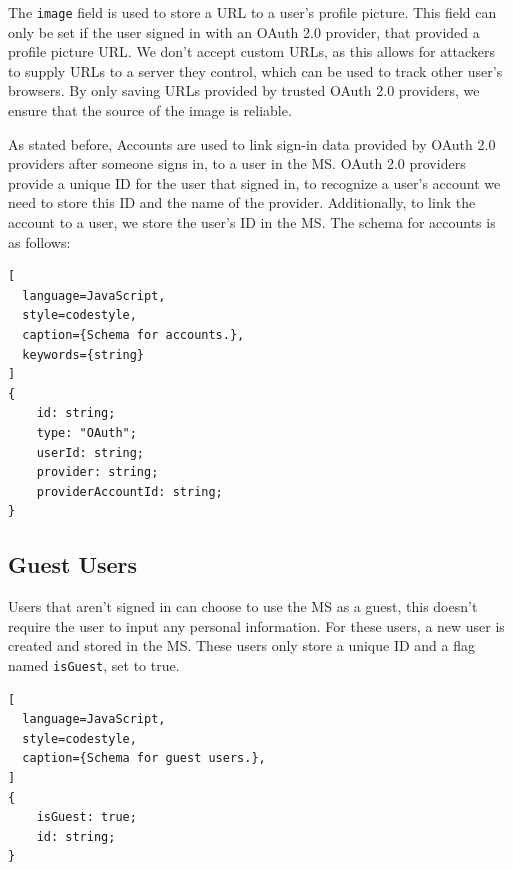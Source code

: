 The \lstinline{image} field is used to store a URL to a user's profile picture. 
This field can only be set if the user signed in with an OAuth 2.0 provider,
that provided a profile picture URL.
We don't accept custom URLs,
as this allows for attackers to supply URLs to a server they control,
which can be used to track other user's browsers.
By only saving URLs provided by trusted OAuth 2.0 providers, we ensure that the
source of the image is reliable.

As stated before, Accounts are used to link sign-in data provided by OAuth 2.0 providers
after someone signs in, to a user in the MS.
OAuth 2.0 providers provide a unique ID for the user that signed in,
to recognize a user's account we need to store this ID and
the name of the provider.
Additionally, to link the account to a user, we store the user's ID in the MS.
The schema for accounts is as follows:

\begin{lstlisting}[
  language=JavaScript,
  style=codestyle,
  caption={Schema for accounts.},
  keywords={string}
]
{
    id: string;
    type: "OAuth";
    userId: string;
    provider: string;
    providerAccountId: string;
}
\end{lstlisting}

\subsection{Guest Users}

Users that aren't signed in can choose to use the MS as a guest, this doesn't require
the user to input any personal information.
For these users, a new user is created and stored in the MS.
These users only store a unique ID and a flag named \lstinline{isGuest}, set to true.

\begin{lstlisting}[
  language=JavaScript,
  style=codestyle,
  caption={Schema for guest users.},
]
{
    isGuest: true;
    id: string;
} 
\end{lstlisting}

